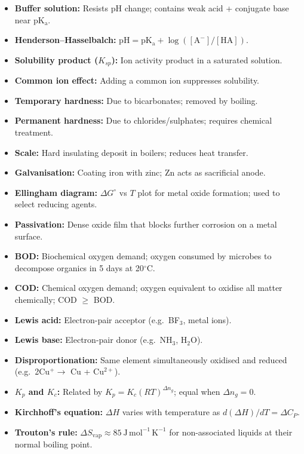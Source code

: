 \documentclass[12pt,a4paper]{article}
\begin{document}
\begin{tcolorbox}[defbox, title={One-Line Definitions}]
\begin{itemize}[leftmargin=*, itemsep=2pt, topsep=2pt]
  \item \textbf{Buffer solution:} Resists pH change; contains weak acid + conjugate base near $\mathrm{pK_a}$.
  \item \textbf{Henderson--Hasselbalch:} $\mathrm{pH} = \mathrm{pK_a} + \log([\mathrm{A^-}]/[\mathrm{HA}])$.
  \item \textbf{Solubility product ($K_{sp}$):} Ion activity product in a saturated solution.
  \item \textbf{Common ion effect:} Adding a common ion suppresses solubility.
  \item \textbf{Temporary hardness:} Due to bicarbonates; removed by boiling.
  \item \textbf{Permanent hardness:} Due to chlorides/sulphates; requires chemical treatment.
  \item \textbf{Scale:} Hard insulating deposit in boilers; reduces heat transfer.
  \item \textbf{Galvanisation:} Coating iron with zinc; Zn acts as sacrificial anode.
  \item \textbf{Ellingham diagram:} $\Delta G^\circ$ vs $T$ plot for metal oxide formation; used to select reducing agents.
  \item \textbf{Passivation:} Dense oxide film that blocks further corrosion on a metal surface.
  \item \textbf{BOD:} Biochemical oxygen demand; oxygen consumed by microbes to decompose organics in 5 days at 20$^\circ$C.
  \item \textbf{COD:} Chemical oxygen demand; oxygen equivalent to oxidise all matter chemically; COD $\geq$ BOD.
  \item \textbf{Lewis acid:} Electron-pair acceptor (e.g.\ BF$_3$, metal ions).
  \item \textbf{Lewis base:} Electron-pair donor (e.g.\ NH$_3$, H$_2$O).
  \item \textbf{Disproportionation:} Same element simultaneously oxidised and reduced (e.g.\ 2Cu$^+ \to$ Cu + Cu$^{2+}$).
  \item \textbf{$K_p$ and $K_c$:} Related by $K_p = K_c(RT)^{\Delta n_g}$; equal when $\Delta n_g = 0$.
  \item \textbf{Kirchhoff's equation:} $\Delta H$ varies with temperature as $d(\Delta H)/dT = \Delta C_P$.
  \item \textbf{Trouton's rule:} $\Delta S_{\mathrm{vap}} \approx 85\ \mathrm{J\,mol^{-1}\,K^{-1}}$ for non-associated liquids at their normal boiling point.
\end{itemize}
\end{tcolorbox}
\end{document}
